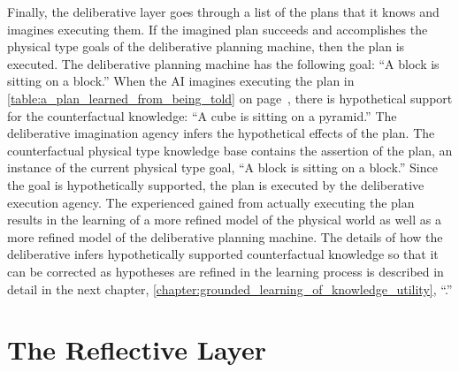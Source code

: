 Finally, the deliberative layer goes through a list of the plans that
it knows and imagines executing them.  If the imagined plan succeeds
and accomplishes the physical type goals of the deliberative planning
machine, then the plan is executed.  The deliberative planning machine
has the following goal: ``A block is sitting on a block.''  When the
AI imagines executing the plan in
{\mbox{\autoref{table:a_plan_learned_from_being_told}}} on
{\mbox{page~\pageref{table:a_plan_learned_from_being_told}}}, there is
hypothetical support for the counterfactual knowledge: ``A cube is
sitting on a pyramid.''  The deliberative imagination agency infers
the hypothetical effects of the plan.  The counterfactual physical
type knowledge base contains the assertion of the plan, an instance of
the current physical type goal, ``A block is sitting on a block.''
Since the goal is hypothetically supported, the plan is executed by
the deliberative execution agency.  The experienced gained from
actually executing the plan results in the learning of a more refined
model of the physical world as well as a more refined model of the
deliberative planning machine.  The details of how the deliberative
infers hypothetically supported counterfactual knowledge so that it
can be corrected as hypotheses are refined in the learning process is
described in detail in the next chapter,
\autoref{chapter:grounded_learning_of_knowledge_utility},
``.''

\section{The Reflective Layer}

